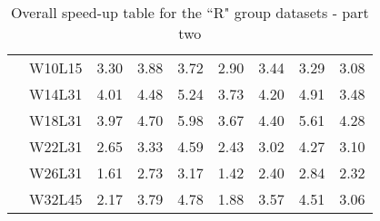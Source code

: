 \begin{table}[!ht]
\begin{tabular}{c r | rrr | rrrr}
		\midrule
		\multirow{6}{*}{\rotatebox[origin=c]{90}{\textbf{R5000}}}
		& W10L15 & 3.30 & 3.88 & 3.72 & 2.90 & 3.44 & 3.29 & 3.08 \\
		& W14L31 & 4.01 & 4.48 & 5.24 & 3.73 & 4.20 & 4.91 & 3.48 \\
		& W18L31 & 3.97 & 4.70 & 5.98 & 3.67 & 4.40 & 5.61 & 4.28 \\
		& W22L31 & 2.65 & 3.33 & 4.59 & 2.43 & 3.02 & 4.27 & 3.10 \\
		& W26L31 & 1.61 & 2.73 & 3.17 & 1.42 & 2.40 & 2.84 & 2.32 \\
		& W32L45 & 2.17 & 3.79 & 4.78 & 1.88 & 3.57 & 4.51 & 3.06 \\
		\bottomrule
	\end{tabular}
	\caption{Overall speed-up table for the “R" group datasets - part two}
	\label{tab:speedup-gruppoR-pt2}
\end{table}
\clearpage


